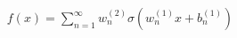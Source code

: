 \documentclass[preview]{standalone}
\begin{document}
\begin{align*}
f(x) = \sum_{n=1}^{\infty} w_n^{(2)} \sigma(w_n^{(1)} x + b_n^{(1)})
\end{align*}
\end{document}
